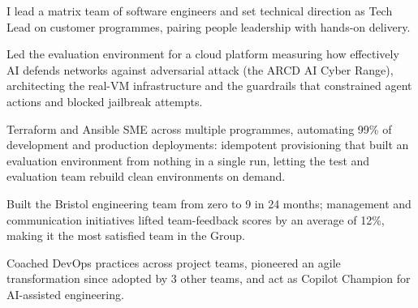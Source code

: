 I lead a matrix team of software engineers and set technical direction as Tech Lead on customer programmes, pairing people leadership with hands-on delivery.
\vspace{0.25em}
\iftechnical%
\begin{tightemize}
    \item Led the evaluation environment for a cloud platform measuring how effectively AI defends networks against adversarial attack (the ARCD AI Cyber Range), architecting the real-VM infrastructure and the guardrails that constrained agent actions and blocked jailbreak attempts.
    \item Terraform and Ansible SME across multiple programmes, automating 99\% of development and production deployments: idempotent provisioning that built an evaluation environment from nothing in a single run, letting the test and evaluation team rebuild clean environments on demand.
    \item Built the Bristol engineering team from zero to 9 in 24 months; management and communication initiatives lifted team-feedback scores by an average of 12\%, making it the most satisfied team in the Group.
    \item Coached DevOps practices across project teams, pioneered an agile transformation since adopted by 3 other teams, and act as Copilot Champion for AI-assisted engineering.
\end{tightemize}
\else%
